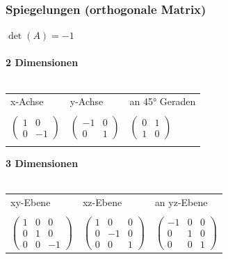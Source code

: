 		  	\subsubsection{Spiegelungen (orthogonale Matrix)}
		  	$\det(A) = -1$ \\
		  	\\
		  	\textbf{2 Dimensionen} \\
		  	\\
		  	\begin{tabular}{lll}
		  	x-Achse & y-Achse & an 45° Geraden \\
		  	\\
		  	$\begin{pmatrix} 1 & 0 \\ 0 & -1 \end{pmatrix}$ & $\begin{pmatrix} -1 & 0 \\ 0 & 1 \end{pmatrix}$ & $\begin{pmatrix} 0 & 1 \\ 1 & 0 \end{pmatrix}$ \\
		  	\\
		  	\end{tabular}
		  	
			\textbf{3 Dimensionen} \\
		  	\\
		  	\begin{tabular}{lll}
		  	xy-Ebene & xz-Ebene & an yz-Ebene\\
		  	\\
		  	$\begin{pmatrix} 1 & 0 & 0 \\ 0 & 1 & 0 \\ 0 & 0 & -1 \end{pmatrix}$ & $\begin{pmatrix} 1 & 0 & 0 \\ 0 & -1 & 0 \\ 0 & 0 & 1 \end{pmatrix}$ & $\begin{pmatrix} -1 & 0 & 0 \\ 0 & 1 & 0 \\ 0 & 0 & 1 \end{pmatrix}$ \\
		  	\end{tabular}		  	
		  	
